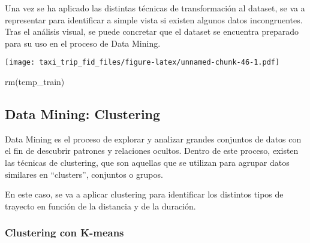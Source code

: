 \documentclass[
]{article}
\newenvironment{Shaded}{\begin{snugshade}}{\end{snugshade}}
\newcommand{\AlertTok}[1]{\textcolor[rgb]{0.94,0.16,0.16}{#1}}
\newcommand{\AttributeTok}[1]{\textcolor[rgb]{0.77,0.63,0.00}{#1}}
\newcommand{\CommentTok}[1]{\textcolor[rgb]{0.56,0.35,0.01}{\textit{#1}}}
\newcommand{\DecValTok}[1]{\textcolor[rgb]{0.00,0.00,0.81}{#1}}
\newcommand{\FunctionTok}[1]{\textcolor[rgb]{0.00,0.00,0.00}{#1}}
\newcommand{\NormalTok}[1]{#1}
\newcommand{\OtherTok}[1]{\textcolor[rgb]{0.56,0.35,0.01}{#1}}
\newcommand{\SpecialCharTok}[1]{\textcolor[rgb]{0.00,0.00,0.00}{#1}}
\begin{document}
Una vez se ha aplicado las distintas técnicas de transformación al
dataset, se va a representar para identificar a simple vista si existen
algunos datos incongruentes. Tras el análisis visual, se puede concretar
que el dataset se encuentra preparado para su uso en el proceso de Data
Mining.

\begin{Shaded}
\end{Shaded}

\texttt{[image: taxi\_trip\_fid\_files/figure-latex/unnamed-chunk-46-1.pdf]}

\begin{Shaded}
\begin{Highlighting}[]
\FunctionTok{rm}\NormalTok{(temp\_train)}
\end{Highlighting}
\end{Shaded}

\hypertarget{data-mining-clustering}{%
\subsection{Data Mining: Clustering}\label{data-mining-clustering}}

Data Mining es el proceso de explorar y analizar grandes conjuntos de
datos con el fin de descubrir patrones y relaciones ocultos. Dentro de
este proceso, existen las técnicas de clustering, que son aquellas que
se utilizan para agrupar datos similares en ``clusters'', conjuntos o
grupos.

En este caso, se va a aplicar clustering para identificar los distintos
tipos de trayecto en función de la distancia y de la duración.

\hypertarget{clustering-con-k-means}{%
\subsubsection{Clustering con K-means}\label{clustering-con-k-means}}
\end{document}
